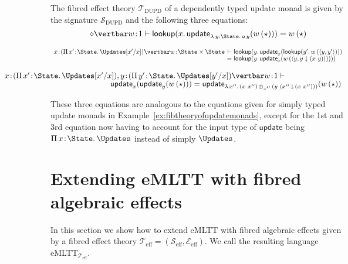 \begin{example}
\label{ex:fibtheoryofdeptypedupdatemonads}
The fibred effect theory $\mathcal{T}_{\text{DUPD}}$ of a dependently typed update monad is given by the signature $\mathcal{S}_{\text{DUPD}}$ and the following three equations:
\[
{\diamond \vertbar w \!:\! 1} \vdash \mathsf{lookup}(x .\, \mathsf{update}_{\lambda\, y : \State .\, \mathsf{o}\, y}(w\, (\star))) = w\, (\star)
\vspace{0.15cm}
\]

\[
\begin{array}{c@{~} c@{~} l}
{x \!:\! (\Pi\, x' \!:\! \State .\, \Updates[x'/x]) \vertbar w \!:\! \State \times \State} & \vdash & \mathsf{lookup}(y .\, \mathsf{update}_{x}(\mathsf{lookup}(y' .\, w\, (\langle y , y' \rangle)))  
\\[-0.5mm]
& = & \mathsf{lookup}(y .\, \mathsf{update}_x(w\, (\langle y , y \downarrow (x\,\, y) \rangle))))
\end{array}
\vspace{0.15cm}
\]

\[
\begin{array}{c}
\hspace{-4.8cm}
{x \!:\! (\Pi\, x' \!:\! \State .\, \Updates[x'/x]), y \!:\! (\Pi\, y' \!:\! \State .\, \Updates[y'/x]) \vertbar w \!:\! 1} \vdash 
\\[-0.5mm]
\hspace{2.5cm}
\mathsf{update}_x(\mathsf{update}_y(w\, (\star))) = \mathsf{update}_{\lambda\, x''.\, (x\,\, x'') \, \oplus_{x''} \, (y\,\, (x'' \,\downarrow\, (x\,\, x'')))}(w\, (\star))
\end{array}
\]

These three equations are analogous to the equations given for simply typed update monads in Example~\ref{ex:fibtheoryofupdatemonads}, except for  
the 1st and 3rd equation now having to account for the input type of $\mathsf{update}$ being $\Pi\, x \!:\! \State.\, \Updates$ instead of simply $\Updates$. 
\end{example}

\section{Extending eMLTT with fibred algebraic effects} 
\label{sect:fibalgeffectsineMLTT}

In this section we show how to extend eMLTT with fibred algebraic effects given by a fibred effect theory $\mathcal{T}_{\text{eff}} = (\mathcal{S}_{\text{eff}},\mathcal{E}_{\text{eff}})$. We call the resulting language eMLTT$_{\mathcal{T}_{\text{eff}}}$. 

